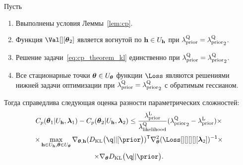 \begin{theorem}
Пусть
\begin{enumerate}
\item Ввыполнены условия Леммы~\ref{lem:cp}.
\item Функция $\Val[][\teta_2]$ является вогнутой по $\mathbf{h} \in U_{\mathbf{h}}$ при  $\lambda_\text{prior}^\text{Q} = {\lambda_\text{prior}^\text{Q}}_2$.
\item Решение задачи~\eqref{eq:cp_theorem_kl}  единственно при  $\lambda_\text{prior}^\text{Q} = {\lambda_\text{prior}^\text{Q}}_2$.
\item Все стационарные точки $\boldsymbol{\theta} \in U_{\boldsymbol{\theta}}$  функции $\Loss$ являются решениями нижней задачи оптимизации при  $\lambda_\text{prior}^\text{Q} = {\lambda_\text{prior}^\text{Q}}_2$ с обратимым гессианом.
\end{enumerate}
Тогда справедлива следующая оценка разности параметрических сложностей:
\[
    C_p(\boldsymbol{\theta}_1|U_{\mathbf{h}}, \boldsymbol{\lambda}_1) - C_p(\boldsymbol{\theta}_2|U_{\mathbf{h}}, \boldsymbol{\lambda}_2)  \leq \frac{\lambda_\text{prior}^\text{L} }{\lambda_\text{likelihood}^\text{Q}} ({\lambda_\text{prior}^\text{Q}}_2 - \lambda_\text{prior}^\text{L}) \times  
\]
\[
 \times \max_{\h \in \Uh, \teta \in \Uteta}  \nabla_{\teta, \h} (\KL{\q}{[\prior})^\mathsf{T}  \nabla_{\teta}^2(\Loss[][][][][\lam_2])^\mathsf{-1} \times
\]
\[\times \nabla_{\teta} \KL{\q}{\prior}.
\]
\end{theorem}
